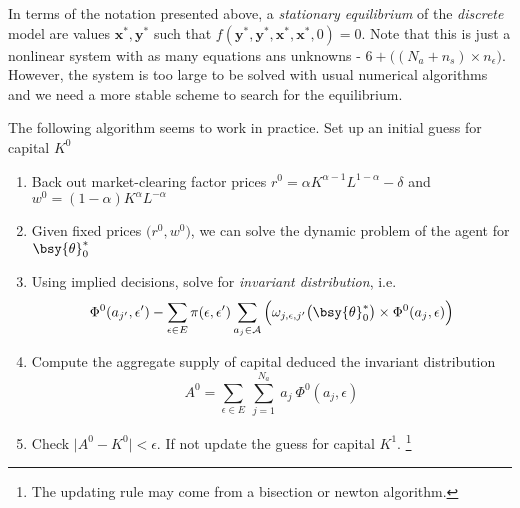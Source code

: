 \documentclass[a4paper,11pt]{article}  %
\begin{document}
In terms of the notation presented above, a \emph{stationary equilibrium} of the \emph{discrete} model
are values $\mathbf{x}^*, \mathbf{y}^*$ such that $f(\mathbf{y}^*,\mathbf{y}^*,\mathbf{x}^*,\mathbf{x}^*, 0)=0$.
Note that this is just a nonlinear system with as many equations ans unknowns - $6 + \big( (N_a+n_s) \times n_{\epsilon}\big)$.
However, the system is too large to be solved with usual numerical algorithms and we need a more stable scheme to search for the equilibrium.

The following algorithm seems to work in practice. Set up an initial guess for capital $K^0$
\begin{enumerate}

   \item Back out market-clearing factor prices $r^0 = \alpha K^{ \alpha -1 } L^{1-\alpha} - \delta $ and
         $ w^0 = (1-\alpha) K^{\alpha} L^{-\alpha}$

   \item Given fixed prices $ \big( r^0, w^0 \big) $, we can solve the dynamic problem of the agent for
         $\bsy{\theta}^*_0$

   \item Using implied decisions, solve for \emph{invariant distribution}, i.e.
         \begin{equation*}
            \Phi^0 ( a_{j'}, \epsilon' ) - \sum_{ \epsilon \in E } \pi( \epsilon, \epsilon' )
            \sum_{ a_j \in \mathcal{A} }
            \Big( \omega_{j,\epsilon, j'} \big( \bsy{\theta}_0^{*} \big) \times \Phi^0(a_j, \epsilon) \Big)
         \end{equation*}

   \item Compute the aggregate supply of capital deduced the invariant distribution
         \[
            A^0 = \sum_{\epsilon \in E} \ \sum_{ j=1 }^{N_a} \ a_j \ \Phi^0 ( a_j, \epsilon )
         \]

   \item Check $ \lvert A^0 - K^0 \rvert < \epsilon $. If not update the guess for capital $ K^1 $.%
         \footnote{The updating rule may come from a bisection or newton algorithm.}
\end{enumerate}


\end{document}
